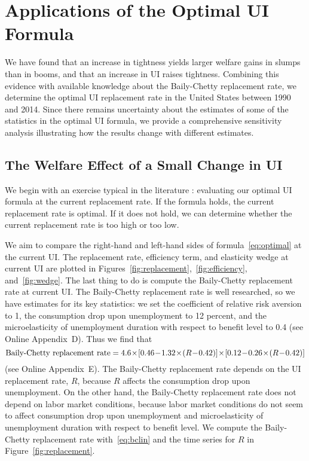 \documentclass[letterpaper,12pt,leqno]{article}
\newcommand{\brk}[1]{\left[ #1 \right]}
\begin{document}
\section{Applications of the Optimal UI Formula}\label{sec:applications}

We have found that an increase in tightness yields larger welfare gains in slumps than in booms, and that an increase in UI raises tightness. Combining this evidence with available knowledge about the Baily-Chetty replacement rate, we determine the optimal UI replacement rate in the United States between 1990 and 2014. Since there remains uncertainty about the estimates of some of the statistics in the optimal UI formula, we provide a comprehensive sensitivity analysis illustrating how the results change with different estimates. 

\subsection{The Welfare Effect of a Small Change in UI}

We begin with an exercise typical in the literature \citep[for example,][]{C08}: evaluating our optimal UI formula at the current replacement rate. If the formula holds, the current replacement rate is optimal. If it does not hold, we can determine whether the current replacement rate is too high or too low.

We aim to compare the right-hand and left-hand sides of formula~\eqref{eq:optimal} at the current UI. The replacement rate, efficiency term, and elasticity wedge at current UI are plotted in Figures~\ref{fig:replacement},~\ref{fig:efficiency}, and~\ref{fig:wedge}. The last thing to do is compute the Baily-Chetty replacement rate at current UI. The Baily-Chetty replacement rate is well researched, so we have estimates for its key statistics: we set the coefficient of relative risk aversion to 1, the consumption drop upon unemployment to 12 percent, and the microelasticity of unemployment duration with respect to benefit level to 0.4 (see Online Appendix~D). Thus we find that
\begin{equation}\medmuskip=1mu 
\text{Baily-Chetty replacement rate}=4.6\times \brk{0.46-1.32\times (R-0.42)}\times \brk{0.12-0.26\times (R-0.42)}
\label{eq:bclin}\end{equation}
(see Online Appendix~E). The Baily-Chetty replacement rate depends on the UI replacement rate, $R$, because $R$ affects the consumption drop upon unemployment. On the other hand, the Baily-Chetty replacement rate does not depend on labor market conditions, because labor market conditions do not seem to affect consumption drop upon unemployment and microelasticity of unemployment duration with respect to benefit level. We compute the Baily-Chetty replacement rate with~\eqref{eq:bclin} and the time series for $R$ in Figure~\ref{fig:replacement}.
\end{document}

